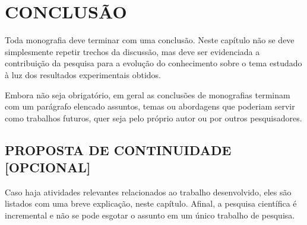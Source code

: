 \chapter{CONCLUSÃO}

Toda monografia deve terminar com uma conclusão. Neste capítulo não se deve simplesmente repetir trechos da discussão, mas deve ser evidenciada a contribuição da pesquisa para a evolução do conhecimento sobre o tema estudado à luz dos resultados experimentais obtidos.

Embora não seja obrigatório, em geral as conclusões de monografias terminam com um parágrafo elencado assuntos, temas ou abordagens que poderiam servir como trabalhos futuros, quer seja pelo próprio autor ou por outros pesquisadores.
\section{PROPOSTA DE CONTINUIDADE [OPCIONAL]}

Caso haja atividades relevantes relacionados ao trabalho desenvolvido, eles são listados com uma breve explicação, neste capítulo. Afinal, a pesquisa científica é incremental e não se pode esgotar o assunto em um único trabalho de pesquisa.
